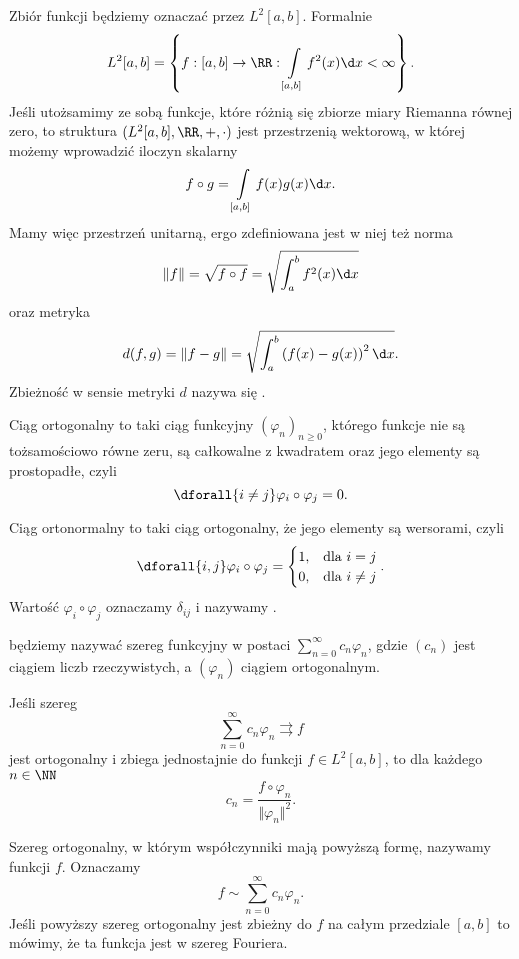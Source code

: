 Zbiór funkcji  będziemy oznaczać przez $L^2[a, b]$. Formalnie
\[ L^2[a, b] = \left\{f: [a, b] \to \RR : \int\limits_{[a, b]} f^2(x) \d x < \infty \right\}. \]
Jeśli utożsamimy ze sobą funkcje, które różnią się zbiorze miary Riemanna równej zero, to struktura $(L^2[a, b], \RR, +, \cdot)$ jest przestrzenią wektorową, w której możemy wprowadzić iloczyn skalarny
\[ f \circ g = \int\limits_{[a, b]} f(x)g(x) \d x. \]
Mamy więc przestrzeń unitarną, ergo zdefiniowana jest w niej też norma
\[ \Vert f \Vert = \sqrt{f \circ f} = \sqrt{\int_a^b f^2(x) \d x} \]
oraz metryka
\[ d(f, g) = \Vert f - g \Vert = \sqrt{\int_a^b \left(f(x) - g(x)\right)^2 \d x}. \]
Zbieżność w sensie metryki $d$ nazywa się .

\begin{definition}
    Ciąg ortogonalny to taki ciąg funkcyjny $(\varphi_n)_{n\geq 0}$, którego funkcje nie są tożsamościowo równe zeru, są całkowalne z kwadratem oraz jego elementy są prostopadłe, czyli
    \[ \dforall{i \neq j} \varphi_i \circ \varphi_j = 0. \]
\end{definition}

\begin{definition}
    Ciąg ortonormalny to taki ciąg ortogonalny, że jego elementy są wersorami, czyli
    \[ \dforall{i, j} \varphi_i \circ \varphi_j = \begin{cases}1, & \text{dla } i = j \\ 0, & \text{dla } i \neq j\end{cases}. \]
    Wartość $\varphi_i \circ \varphi_j$ oznaczamy $\delta_{ij}$ i nazywamy .
\end{definition}

 będziemy nazywać szereg funkcyjny w postaci $\sum_{n=0}^\infty c_n\varphi_n$, gdzie $(c_n)$ jest ciągiem liczb rzeczywistych, a $(\varphi_n)$ ciągiem ortogonalnym.

\begin{theorem}
    \label{t:Euler-Fourier}
    Jeśli szereg
    \[ \sum_{n=0}^\infty c_n\varphi_n \rightrightarrows f \]
    jest ortogonalny i zbiega jednostajnie do funkcji $f \in L^2[a, b]$, to dla każdego $n \in \NN$
    \[ c_n = \frac{f \circ \varphi_n}{\Vert \varphi_n \Vert^2}. \]
\end{theorem}

Szereg ortogonalny, w którym współczynniki mają powyższą formę, nazywamy  funkcji $f$. Oznaczamy
\[ f \sim \sum_{n=0}^\infty c_n\varphi_n. \]
Jeśli powyższy szereg ortogonalny jest zbieżny do $f$ na całym przedziale $[a, b]$ to mówimy, że ta funkcja jest  w szereg Fouriera.

